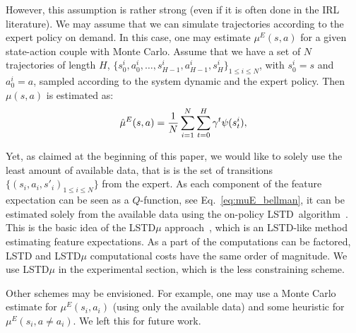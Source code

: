 \documentclass[tablecaption=bottom]{jmlr}
\begin{document}
However, this assumption is rather strong (even if it is often done
in the IRL literature). We may assume that we can simulate
trajectories according to the expert policy on demand. In this case,
one may estimate $\mu^E(s,a)$ for a given state-action couple with
Monte Carlo. Assume that we have a set of $N$ trajectories of length
$H$, $\{s^i_0,a^i_0,\dots,s^i_{H-1},a^i_{H-1},s^i_{H}\}_{1\leq i
\leq N}$, with $s^i_0 =s$ and $a^i_0=a$, sampled according to the
system dynamic and the expert policy. Then $\mu(s,a)$ is estimated
as:
\begin{equation}
\hat\mu^E(s,a) = {1\over
N}\sum_{i=1}^{N}\sum^{H}_{t=0}\gamma^t\psi(s^i_t),
\end{equation}

Yet, as claimed at the beginning of this paper, we would like to
solely use the least amount of available data, that is is the set of
transitions $\{(s_i,a_i,s'_{i})_{1\leq i\leq N}\}$ from the expert.
As each component of the feature expectation can be seen as a
$Q$-function, see Eq.~\eqref{eq:muE_bellman}, it can be estimated
solely from the available data using the on-policy
LSTD~algorithm~\cite{bradtke1996linear}. This is the basic idea of
the LSTD$\mu$ approach~\cite{klein2011batch}, which is an LSTD-like
method estimating feature expectations. As a part of the
computations can be factored, LSTD and LSTD$\mu$ computational costs
have the same order of magnitude. We use LSTD$\mu$ in the
experimental section, which is the less constraining scheme.

Other schemes may be envisioned. For example, one may use a Monte
Carlo estimate for $\mu^E(s_i,a_i)$ (using only the available data)
and some heuristic for $\mu^E(s_i,a\neq a_i)$. We left this for
future work.
\end{document}

